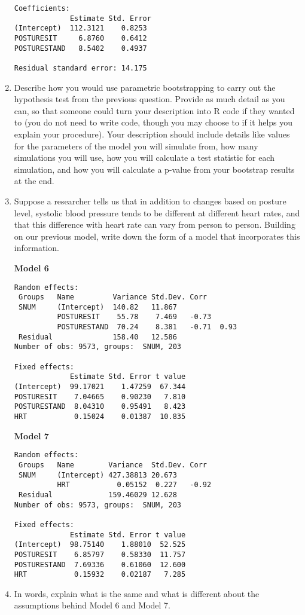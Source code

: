 \documentclass[11pt]{article}
\begin{document}
\begin{enumerate}
\begin{verbatim}
Coefficients:
             Estimate Std. Error 
(Intercept)  112.3121    0.8253
POSTURESIT     6.8760    0.6412
POSTURESTAND   8.5402    0.4937

Residual standard error: 14.175
\end{verbatim}

\item Describe how you would use parametric bootstrapping to carry out the hypothesis test from the previous question. Provide as much detail as you can, so that someone could turn your description into R code if they wanted to (you do not need to write code, though you may choose to if it helps you explain your procedure). Your description should include details like values for the parameters of the model you will simulate from, how many simulations you will use, how you will calculate a test statistic for each simulation, and how you will calculate a p-value from your bootstrap results at the end.


\pagebreak


\item Suppose a researcher tells us that in addition to changes based on posture level, systolic blood pressure tends to be different at different heart rates, and that this difference with heart rate can vary from person to person. Building on our previous model, write down the form of a model that incorporates this information. 

\pagebreak

\textbf{Model 6} 

\begin{verbatim}
Random effects:
 Groups   Name         Variance Std.Dev. Corr       
 SNUM     (Intercept)  140.82   11.867              
          POSTURESIT    55.78    7.469   -0.73      
          POSTURESTAND  70.24    8.381   -0.71  0.93
 Residual              158.40   12.586              
Number of obs: 9573, groups:  SNUM, 203

Fixed effects:
             Estimate Std. Error t value
(Intercept)  99.17021    1.47259  67.344
POSTURESIT    7.04665    0.90230   7.810
POSTURESTAND  8.04310    0.95491   8.423
HRT           0.15024    0.01387  10.835
\end{verbatim}

\textbf{Model 7} 
\begin{verbatim} 
Random effects:
 Groups   Name        Variance  Std.Dev. Corr 
 SNUM     (Intercept) 427.38813 20.673        
          HRT           0.05152  0.227   -0.92
 Residual             159.46029 12.628        
Number of obs: 9573, groups:  SNUM, 203

Fixed effects:
             Estimate Std. Error t value
(Intercept)  98.75140    1.88010  52.525
POSTURESIT    6.85797    0.58330  11.757
POSTURESTAND  7.69336    0.61060  12.600
HRT           0.15932    0.02187   7.285
\end{verbatim}

\item In words, explain what is the same and what is different about the assumptions behind Model 6 and Model 7. 


\end{enumerate}
\end{document}
